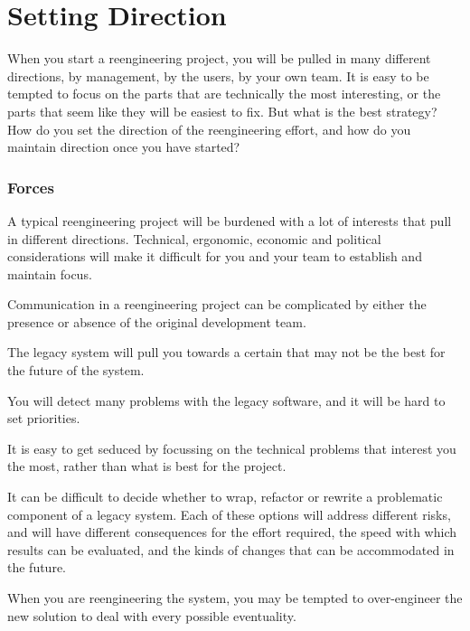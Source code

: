 \documentclass[a4paper,10pt,twoside]{book}
\begin{document}
	\renewcommand{\nnbb}[2]{} %
	\sloppy
\fi
\chapter{Setting Direction}

When you start a reengineering project, you will be pulled in many different directions, by management, by the users, by your own team. It is easy to be tempted to focus on the parts that are technically the most interesting, or the parts that seem like they will be easiest to fix. But what is the best strategy? How do you set the direction of the reengineering effort, and how do you maintain direction once you have started?

\subsection*{Forces}
\begin{bulletlist}
  \item A typical reengineering project will be burdened with a lot of interests that pull in different directions. Technical, ergonomic, economic and political considerations will make it difficult for you and your team to establish and maintain focus. 

  \item Communication in a reengineering project can be complicated by either the presence or absence of the original development team.

  \item The legacy system will pull you towards a certain  that may not be the best for the future of the system.

  \item You will detect many problems with the legacy software, and it will be hard to set priorities.

  \item It is easy to get seduced by focussing on the technical problems that interest you the most, rather than what is best for the project.

  \item It can be difficult to decide whether to wrap, refactor or rewrite a problematic component of a legacy system. Each of these options will address different risks, and will have different consequences for the effort required, the speed with which results can be evaluated, and the kinds of changes that can be accommodated in the future.

  \item When you are reengineering the system, you may be tempted to over-engineer the new solution to deal with every possible eventuality.
\end{bulletlist}
\end{document}
